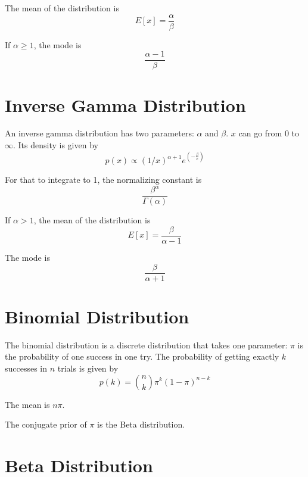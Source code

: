 \documentclass[12pt]{article}
\begin{document}
The mean of the distribution is
\begin{equation*}
E[x] = \frac{ \alpha}{\beta}
\end{equation*}

If $\alpha \geq 1$, the mode is 
\begin{equation*}
\frac{ \alpha - 1}{\beta}
\end{equation*}


\section*{Inverse Gamma Distribution}

An inverse gamma distribution has two parameters: $\alpha$ and $\beta$. $x$ can go from $0$ to $\infty$. Its density is given by
\begin{equation*}
p(x) \propto 
(1/x)^{\alpha + 1}e^{\left(-\frac{\beta}{x}\right)}
\end{equation*}

For that to integrate to 1, the normalizing constant is
\begin{equation*}
\frac{\beta^\alpha}{\Gamma(\alpha)}
\end{equation*}

If $\alpha > 1$, the mean of the distribution is
\begin{equation*}
E[x] = \frac{ \beta}{\alpha - 1} 
\end{equation*}

The mode is 
\begin{equation*}
\frac{ \beta}{\alpha + 1}
\end{equation*}

\section*{Binomial Distribution}

The binomial distribution is a discrete distribution that takes one parameter: $\pi$ is the probability of one success in one try. The probability of getting exactly $k$ successes in $n$ trials is given by
\begin{equation*}
p(k) = \binom{n}{k}\pi^k(1-\pi)^{n-k}
\end{equation*}

The mean is $n\pi$.

The conjugate prior of $\pi$ is the Beta distribution.

\section*{Beta Distribution}
\end{document}
